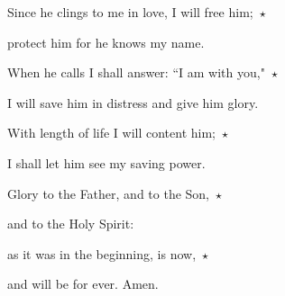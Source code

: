 \noindent Since he clings to me in love, I will free him;~$\star$~\nopagebreak

protect him for he knows my name.

\noindent When he calls I shall answer: ``I am with you,"~$\star$~\nopagebreak

I will save him in distress and give him glory.

\noindent With length of life I will content him;~$\star$~\nopagebreak

I shall let him see my saving power.

\noindent Glory to the Father, and to the Son,~$\star$~\nopagebreak

and to the Holy Spirit:

\noindent as it was in the beginning, is now,~$\star$~\nopagebreak

and will be for ever. Amen.
